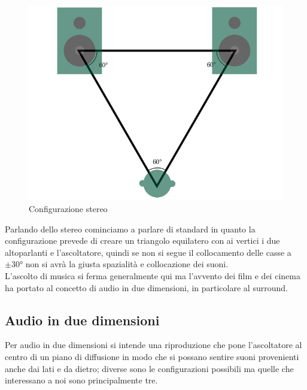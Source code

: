 \documentclass[12pt,a4paper]{report}
\begin{document}
\begin{figure}[htbp]
	\centering
	\includegraphics[scale=0.30]{figures/stereo.jpg}
	\caption {Configurazione stereo}
	\label{fig:stereo}
	\end{figure}

Parlando dello stereo cominciamo a parlare di standard in quanto la configurazione prevede di creare un triangolo equilatero con ai vertici i due altoparlanti e l'ascoltatore,  quindi se non si segue il collocamento delle casse a $\pm 30°$ non si avrà la giusta spazialità e collocazione dei suoni.\\

L'ascolto di musica si ferma generalmente qui ma l'avvento dei film e dei cinema ha portato al concetto di audio in due dimensioni, in particolare al surround.


\subsection{Audio in due dimensioni}

Per audio in due dimensioni si intende una riproduzione che pone l'ascoltatore al centro di un piano di diffusione in modo che si possano sentire suoni provenienti anche dai lati e da dietro; diverse sono le configurazioni possibili ma quelle che interessano a noi sono principalmente tre.\\
\end{document}

